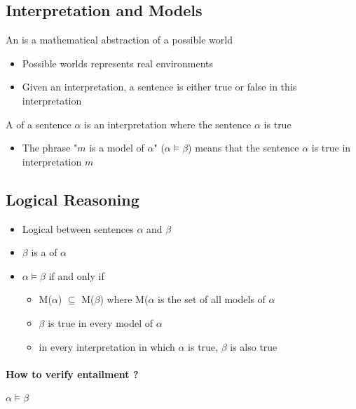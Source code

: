 \subsection{Interpretation and Models}

An  is a mathematical abstraction of a possible world
\begin{itemize}
\item Possible worlds represents real environments
\item Given an interpretation, a sentence is either true or false in this interpretation
\end{itemize}

A  of a sentence $\alpha$ is an interpretation where the sentence $\alpha$ is true
\begin{itemize}
\item The phrase "$m$ is a model of $\alpha$" ($\alpha \models \beta$) means that the sentence $\alpha$ is true in interpretation $m$
\end{itemize}

\subsection{Logical Reasoning}

\begin{itemize}
\item Logical  between sentences $\alpha$ and $\beta$\\
\item $\beta$ is a  of $\alpha$\\
\item $\alpha \models \beta$ if and only if
	\begin{itemize}
	\item M($\alpha$) $\subseteq$ M($\beta$) where M($\alpha$ is the set of all models of $\alpha$
	\item $\beta$ is true in every model of $\alpha$
	\item in every interpretation in which $\alpha$ is true, $\beta$ is also true
	\end{itemize}
\end{itemize}

\paragraph{How to verify entailment ?}

$\alpha \models \beta$

